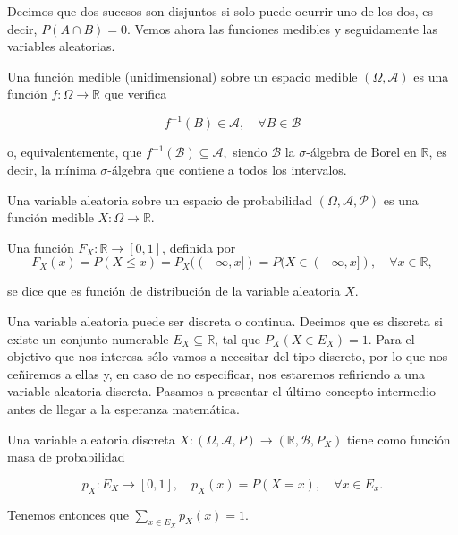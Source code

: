 Decimos que dos sucesos son disjuntos si solo puede ocurrir uno de los dos, es decir, $P(A \cap B)=0$. Vemos ahora las funciones medibles y seguidamente las variables aleatorias.

\begin{definicion}
	Una función medible (unidimensional) sobre un espacio medible $(\Omega, \mathcal{A})$ es una función $f: \Omega \rightarrow \mathbb{R}$ que verifica

	\begin{equation*}
		f^{-1}(B) \in \mathcal{A}, \quad \forall B \in \mathcal{B}
	\end{equation*} 

	o, equivalentemente, que $f^{-1}(\mathcal{B}) \subseteq \mathcal{A},$ siendo $\mathcal{B}$ la $\sigma$-álgebra de Borel en $\mathbb{R}$, es decir, la mínima $\sigma$-álgebra que contiene a todos los intervalos.

\end{definicion}


\begin{definicion}
	Una variable aleatoria sobre un espacio de probabilidad $(\Omega, \mathcal{A}, \mathcal{P})$ es una función medible $X: \Omega \rightarrow \mathbb{R}$.
\end{definicion}

\begin{definicion}
	Una función $F_X:\mathbb{R} \rightarrow [0,1]$, definida por
	\begin{equation*}
		F_X(x)=P(X \leq x) = P_X((- \infty , x]) = P( X \in (- \infty, x ]), \quad \forall x \in \mathbb{R},
	\end{equation*}

	se dice que es función de distribución de la variable aleatoria $X$.
\end{definicion}

Una variable aleatoria puede ser discreta o continua. Decimos que es discreta si existe un conjunto numerable $E_X \subseteq \mathbb{R}$, tal que $P_X(X \in E_X) = 1$. Para el objetivo que nos interesa sólo vamos a necesitar del tipo discreto, por lo que nos ceñiremos a ellas y, en caso de no especificar, nos estaremos refiriendo a una variable aleatoria discreta. Pasamos a presentar el último concepto intermedio antes de llegar a la esperanza matemática.

\begin{definicion}
	Una variable aleatoria discreta $X: (\Omega, \mathcal{A}, P) \rightarrow (\mathbb{R}, \mathcal{B}, P_X)$ tiene como función masa de probabilidad
	
	\begin{equation*}
		p_X: E_X \rightarrow [0,1], \quad p_X(x) = P(X=x), \quad \forall x \in E_x.
	\end{equation*}

	Tenemos entonces que $\sum_{x \in E_X} p_X(x)=1$.
\end{definicion}


